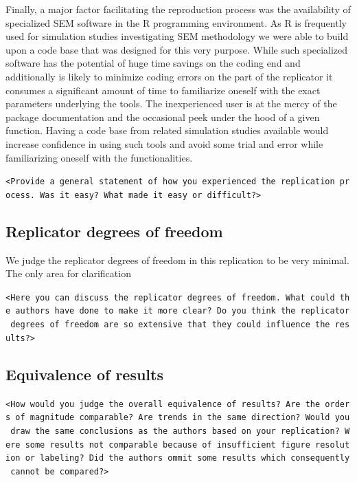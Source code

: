 \documentclass[10,a4paperpaper,]{article}
\begin{document}
Finally, a major factor facilitating the reproduction process was the
availability of specialized SEM software in the R programming
environment. As R is frequently used for simulation studies
investigating SEM methodology we were able to build upon a code base
that was designed for this very purpose. While such specialized software
has the potential of huge time savings on the coding end and
additionally is likely to minimize coding errors on the part of the
replicator it consumes a significant amount of time to familiarize
oneself with the exact parameters underlying the tools. The
inexperienced user is at the mercy of the package documentation and the
occasional peek under the hood of a given function. Having a code base
from related simulation studies available would increase confidence in
using such tools and avoid some trial and error while familiarizing
oneself with the functionalities.

\texttt{\textless{}Provide\ a\ general\ statement\ of\ how\ you\ experienced\ the\ replication\ process.\ Was\ it\ easy?\ What\ made\ it\ easy\ or\ difficult?\textgreater{}}

\subsection{Replicator degrees of freedom}

We judge the replicator degrees of freedom in this replication to be
very minimal. The only area for clarification

\texttt{\textless{}Here\ you\ can\ discuss\ the\ replicator\ degrees\ of\ freedom.\ What\ could\ the\ authors\ have\ done\ to\ make\ it\ more\ clear?\ Do\ you\ think\ the\ replicator\ degrees\ of\ freedom\ are\ so\ extensive\ that\ they\ could\ influence\ the\ results?\textgreater{}}

\subsection{Equivalence of results}

\texttt{\textless{}How\ would\ you\ judge\ the\ overall\ equivalence\ of\ results?\ Are\ the\ orders\ of\ magnitude\ comparable?\ Are\ trends\ in\ the\ same\ direction?\ Would\ you\ draw\ the\ same\ conclusions\ as\ the\ authors\ based\ on\ your\ replication?\ Were\ some\ results\ not\ comparable\ because\ of\ insufficient\ figure\ resolution\ or\ labeling?\ Did\ the\ authors\ ommit\ some\ results\ which\ consequently\ cannot\ be\ compared?\textgreater{}}
\end{document}

